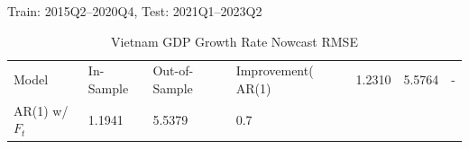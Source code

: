 \begin{table}[h]\centering
\caption{Vietnam GDP Growth Rate Nowcast RMSE}
\footnotesize{Train: 2015Q2–2020Q4, Test: 2021Q1–2023Q2}
\begin{tabular}{llll}
\toprule
Model & In-Sample & Out-of-Sample & Improvement(%
\midrule
AR(1) & 1.2310 & 5.5764 & - \\
AR(1) w/ $F_t$ & 1.1941 & 5.5379 & 0.7%
\bottomrule
\end{tabular}
\end{table}
